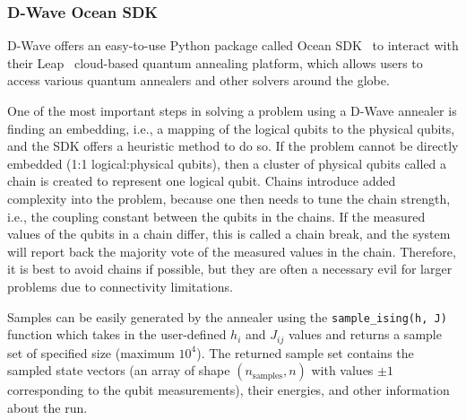 \subsubsection{D-Wave Ocean SDK}
D-Wave offers an easy-to-use Python package called Ocean SDK~\cite{dwave_ocean} to interact with their Leap~\cite{dwave_leap} cloud-based quantum annealing platform, which allows users to access various quantum annealers and other solvers around the globe.

One of the most important steps in solving a problem using a D-Wave annealer is finding an embedding, i.e., a mapping of the logical qubits to the physical qubits, and the SDK offers a heuristic method to do so.
If the problem cannot be directly embedded (1:1 logical:physical qubits), then a cluster of physical qubits called a chain is created to represent one logical qubit.
Chains introduce added complexity into the problem, because one then needs to tune the chain strength, i.e., the coupling constant between the qubits in the chains.
If the measured values of the qubits in a chain differ, this is called a chain break, and the system will report back the majority vote of the measured values in the chain.
Therefore, it is best to avoid chains if possible, but they are often a necessary evil for larger problems due to connectivity limitations.

Samples can be easily generated by the annealer using the \texttt{sample\_ising(h, J)} function which takes in the user-defined \( h_i \) and \( J_{ij} \) values and returns a sample set of specified size (maximum \( 10^4 \)).
The returned sample set contains the sampled state vectors (an array of shape \( (n_\text{samples}, n) \) with values \( \pm 1 \) corresponding to the qubit measurements), their energies, and other information about the run.

